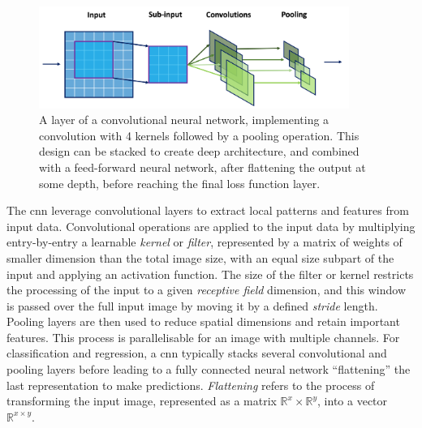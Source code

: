 \begin{figure}[h!]
    \center
    \includegraphics[width=0.9\textwidth]{Images/ML/cnn.png}
    \caption{A layer of a convolutional neural network, implementing a convolution with 4 kernels followed by a pooling operation. This design can be stacked to create deep architecture, and combined with a feed-forward neural network, after flattening the output at some depth, before reaching the final loss function layer.} 
    \label{fig:cnnDesign}
\end{figure}

The \gls{cnn} leverage convolutional layers to extract local patterns and features from input data. Convolutional operations are applied to the input data by multiplying entry-by-entry a learnable \textit{kernel} or \textit{filter}, represented by a matrix of weights of smaller dimension than the total image size, with an equal size subpart of the input and applying an activation function. The size of the filter or kernel restricts the processing of the input to a given \textit{receptive field} dimension, and this window is passed over the full input image by moving it by a defined \textit{stride} length. Pooling layers are then used to reduce spatial dimensions and retain important features. This process is parallelisable for an image with multiple channels. For classification and regression, a \gls{cnn} typically stacks several convolutional and pooling layers before leading to a fully connected neural network ``flattening'' the last representation to make predictions. \textit{Flattening} refers to the process of transforming the input image, represented as a matrix $\mathbb{R}^{x} \times \mathbb{R}^{y}$, into a vector $\mathbb{R}^{x \times y}$. \\

